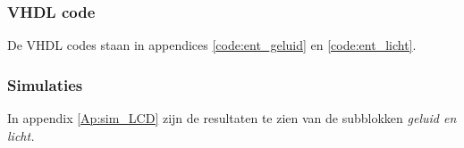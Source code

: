 \subsubsection{VHDL code}
De VHDL codes staan in appendices \ref{code:ent_geluid} en \ref{code:ent_licht}.

\subsubsection{Simulaties}
In appendix \ref{Ap:sim_LCD} zijn de resultaten te zien van de subblokken \it{geluid} en \it{licht}.
